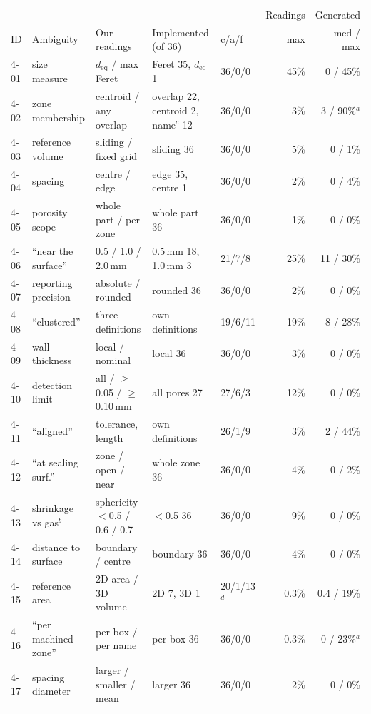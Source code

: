 \documentclass[letterpaper]{article} %
\begin{document}
\begin{table}[t]
\centering
\small
\begin{tabular}{@{}lllllrr@{}}
\toprule
 & & & & & \multicolumn{1}{c}{Readings} & \multicolumn{1}{c}{Generated} \\
ID & Ambiguity & Our readings & Implemented (of 36) & c/a/f & max & med / max \\
\midrule
4-01 & size measure & $d_\mathrm{eq}$ / max Feret & Feret 35, $d_\mathrm{eq}$ 1 & 36/0/0 & 45\% & 0 / 45\% \\
4-02 & zone membership & centroid / any overlap & overlap 22, centroid 2, name$^c$ 12 & 36/0/0 & 3\% & 3 / 90\%$^a$ \\
4-03 & reference volume & sliding / fixed grid & sliding 36 & 36/0/0 & 5\% & 0 / 1\% \\
4-04 & spacing & centre / edge & edge 35, centre 1 & 36/0/0 & 2\% & 0 / 4\% \\
4-05 & porosity scope & whole part / per zone & whole part 36 & 36/0/0 & 1\% & 0 / 0\% \\
4-06 & ``near the surface'' & 0.5 / 1.0 / 2.0\,mm & 0.5\,mm 18, 1.0\,mm 3 & 21/7/8 & 25\% & 11 / 30\% \\
4-07 & reporting precision & absolute / rounded & rounded 36 & 36/0/0 & 2\% & 0 / 0\% \\
4-08 & ``clustered'' & three definitions & own definitions & 19/6/11 & 19\% & 8 / 28\% \\
4-09 & wall thickness & local / nominal & local 36 & 36/0/0 & 3\% & 0 / 0\% \\
4-10 & detection limit & all / $\ge$0.05 / $\ge$0.10\,mm & all pores 27 & 27/6/3 & 12\% & 0 / 0\% \\
4-11 & ``aligned'' & tolerance, length & own definitions & 26/1/9 & 3\% & 2 / 44\% \\
4-12 & ``at sealing surf.'' & zone / open / near & whole zone 36 & 36/0/0 & 4\% & 0 / 2\% \\
4-13 & shrinkage vs gas$^b$ & sphericity $<$0.5 / 0.6 / 0.7 & $<$0.5 36 & 36/0/0 & 9\% & 0 / 0\% \\
4-14 & distance to surface & boundary / centre & boundary 36 & 36/0/0 & 4\% & 0 / 0\% \\
4-15 & reference area & 2D area / 3D volume & 2D 7, 3D 1 & 20/1/13$^d$ & 0.3\% & 0.4 / 19\% \\
4-16 & ``per machined zone'' & per box / per name & per box 36 & 36/0/0 & 0.3\% & 0 / 23\%$^a$ \\
4-17 & spacing diameter & larger / smaller / mean & larger 36 & 36/0/0 & 2\% & 0 / 0\% \\

\end{tabular}
\end{table}
\end{document}
